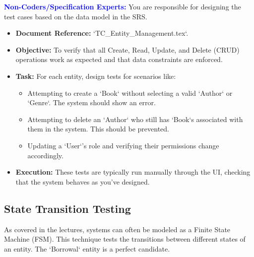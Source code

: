 \documentclass{article}
\newcommand{\role}[1]{\textbf{\textcolor{blue}{#1:}}}
\begin{document}
\role{Non-Coders/Specification Experts}
You are responsible for designing the test cases based on the data model in the SRS.
\begin{itemize}
    \item \textbf{Document Reference:} `TC\_Entity\_Management.tex`.
    \item \textbf{Objective:} To verify that all Create, Read, Update, and Delete (CRUD) operations work as expected and that data constraints are enforced.
    \item \textbf{Task:} For each entity, design tests for scenarios like:
    \begin{itemize}
        \item Attempting to create a `Book` without selecting a valid `Author` or `Genre`. The system should show an error.
        \item Attempting to delete an `Author` who still has `Book`s associated with them in the system. This should be prevented.
        \item Updating a `User`'s role and verifying their permissions change accordingly.
    \end{itemize}
    \item \textbf{Execution:} These tests are typically run manually through the UI, checking that the system behaves as you've designed.
\end{itemize}

\subsection{State Transition Testing}
As covered in the lectures, systems can often be modeled as a Finite State Machine (FSM). This technique tests the transitions between different states of an entity. The `Borrowal` entity is a perfect candidate.
\end{document}
